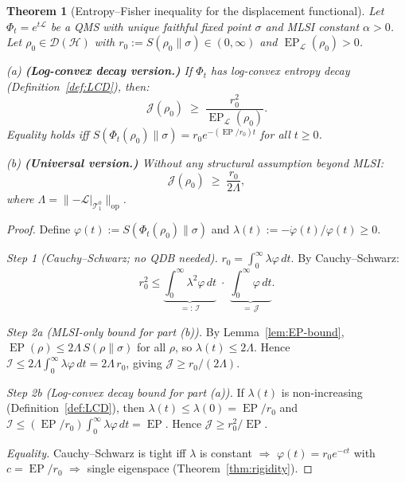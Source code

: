 \documentclass[11pt,a4paper]{article}
\newtheorem{theorem}{Theorem}[section]
\theoremstyle{definition}
\theoremstyle{remark}
\DeclareMathOperator{\EP}{EP}
\newcommand{\HH}{\mathcal{H}}
\newcommand{\DD}{\mathcal{D}}
\newcommand{\TT}{\mathcal{T}}
\newcommand{\LL}{\mathcal{L}}
\newcommand{\norm}[1]{\lVert #1 \rVert}
\begin{document}
\begin{theorem}[Entropy--Fisher inequality for the displacement
functional]\label{thm:main}
Let $\Phi_t = e^{t\LL}$ be a QMS with unique faithful fixed point
$\sigma$ and MLSI constant $\alpha > 0$.  Let $\rho_0 \in \DD(\HH)$
with $r_0 := S(\rho_0\|\sigma) \in (0, \infty)$ and
$\EP_\LL(\rho_0) > 0$.

\textup{(a)} \textbf{(Log-convex decay version.)}
If $\Phi_t$ has log-convex entropy decay
(Definition~\ref{def:LCD}), then:
\begin{equation}\label{eq:CR}
  \boxed{\mathcal{J}(\rho_0) \;\ge\;
  \frac{r_0^2}{\EP_\LL(\rho_0)}.}
\end{equation}
Equality holds iff $S(\Phi_t(\rho_0)\|\sigma) = r_0 e^{-(\EP/r_0)t}$
for all $t \ge 0$.

\textup{(b)} \textbf{(Universal version.)}  Without any structural
assumption beyond MLSI:
\begin{equation}\label{eq:CR-weak}
  \mathcal{J}(\rho_0) \;\ge\; \frac{r_0}{2\Lambda},
\end{equation}
where $\Lambda = \norm{-\LL|_{\TT_1^0}}_{\mathrm{op}}$.
\end{theorem}

\begin{proof}
Define $\varphi(t) := S(\Phi_t(\rho_0)\|\sigma)$ and
$\lambda(t) := -\dot\varphi(t)/\varphi(t) \ge 0$.

\emph{Step 1 (Cauchy--Schwarz; no QDB needed).}
$r_0 = \int_0^\infty \lambda\varphi\,dt$.  By Cauchy--Schwarz:
\begin{equation}\label{eq:CS-clean}
  r_0^2 \le
  \underbrace{\int_0^\infty \!\lambda^2\varphi\,dt}_{=:\,\mathcal{I}}
  \;\cdot\;
  \underbrace{\int_0^\infty \!\varphi\,dt}_{=\,\mathcal{J}}.
\end{equation}

\emph{Step 2a (MLSI-only bound for part (b)).}
By Lemma~\ref{lem:EP-bound}, $\EP(\rho) \le 2\Lambda\,S(\rho\|\sigma)$
for all $\rho$, so $\lambda(t) \le 2\Lambda$.  Hence
$\mathcal{I} \le 2\Lambda\int_0^\infty\lambda\varphi\,dt
= 2\Lambda\,r_0$,
giving $\mathcal{J} \ge r_0/(2\Lambda)$.

\emph{Step 2b (Log-convex decay bound for part (a)).}
If $\lambda(t)$ is non-increasing
(Definition~\ref{def:LCD}), then
$\lambda(t) \le \lambda(0) = \EP/r_0$ and
$\mathcal{I} \le (\EP/r_0)\int_0^\infty\lambda\varphi\,dt
= \EP$.
Hence $\mathcal{J} \ge r_0^2/\EP$.

\emph{Equality.}  Cauchy--Schwarz is tight iff $\lambda$ is constant
$\Rightarrow$ $\varphi(t) = r_0 e^{-ct}$ with $c = \EP/r_0$
$\Rightarrow$ single eigenspace (Theorem~\ref{thm:rigidity}).
\end{proof}
\end{document}
